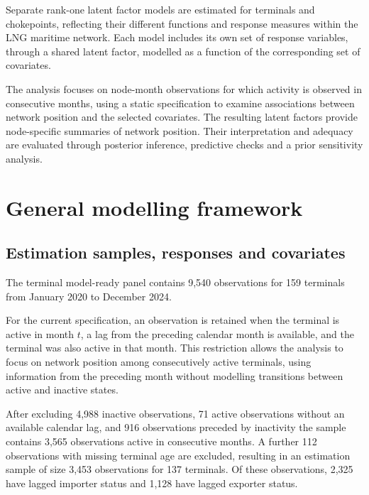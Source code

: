 \documentclass[pdftex,12pt,openright,a4paper,oneside]{book}
\begin{document}
Separate rank-one latent factor models are
estimated for terminals and chokepoints,
reflecting their different functions and response
measures within the LNG maritime network.
Each model includes its own set of response variables,
through a shared latent factor, modelled as a function of the corresponding set of covariates.

The analysis focuses on node-month observations
for which activity is observed in consecutive months, using a
static specification to examine associations
between network position and the selected
covariates. The resulting latent factors provide
node-specific summaries of network position. 
Their interpretation and adequacy are evaluated
through posterior inference, predictive checks
and a prior sensitivity analysis.


\section{General modelling framework}
\subsection{Estimation samples, responses and covariates}
\label{sec:criticality_sample}
\label{sec:simple_responses}

The terminal model-ready panel contains 9,540 observations
for 159 terminals from January 2020 to December 2024.

For the current specification, an observation is retained
when the terminal is active in month $t$, a lag from the
preceding calendar month is available, and the terminal
was also active in that month. This restriction allows
the analysis to focus on network position among
consecutively active terminals, using information
from the preceding month without modelling transitions
between active and inactive states. 

After excluding 4,988 inactive observations,
71 active observations without an available calendar
lag, and 916 observations preceded by inactivity
the sample contains 3,565 observations active in consecutive
months. A further 112 observations with missing
terminal age are excluded, resulting in an estimation
sample of size 3,453 observations for 137 terminals.
Of these observations, 2,325 have lagged importer status and
1,128 have lagged exporter status.
\end{document}
